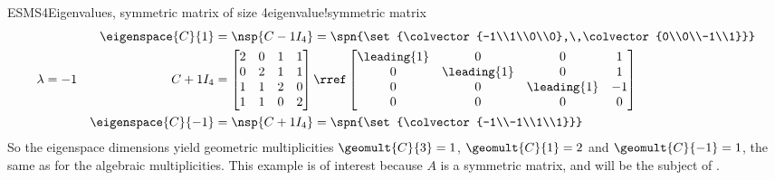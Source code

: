 \begin{example}{ESMS4}{Eigenvalues, symmetric matrix of size 4}{eigenvalue!symmetric matrix}
\begin{align*}
&&\eigenspace{C}{1}&=\nsp{C-1I_4}
=\spn{\set{\colvector{-1\\1\\0\\0},\,\colvector{0\\0\\-1\\1}}}\\
%
\lambda&=-1&C+1I_4&=
\begin{bmatrix}
2 & 0 & 1 & 1\\
0 & 2 & 1 & 1\\
1 & 1 & 2 & 0\\
1 & 1 & 0 & 2
\end{bmatrix}
\rref
\begin{bmatrix}
\leading{1} & 0 & 0 & 1\\
0 & \leading{1} & 0 & 1\\
0 & 0 & \leading{1} & -1\\
0 & 0 & 0 & 0
\end{bmatrix}\\
&&\eigenspace{C}{-1}&=\nsp{C+1I_4}
=\spn{\set{\colvector{-1\\-1\\1\\1}}}\\
%
\end{align*}
%
So the eigenspace dimensions yield geometric multiplicities $\geomult{C}{3}=1$, $\geomult{C}{1}=2$ and $\geomult{C}{-1}=1$, the same as for the algebraic multiplicities.  This example is of interest because $A$ is a symmetric matrix, and will be the subject of .
%
\end{example}
%
